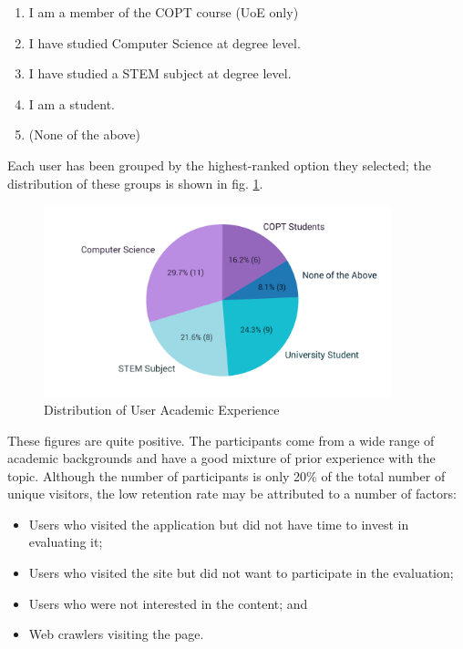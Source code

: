 \documentclass[bsc,twoside,singlespacing,parskip,logo,notimes,normalheadings]{infthesis}
\begin{document}
    \begin{enumerate}
      \item I am a member of the COPT course (UoE only)
      \item I have studied Computer Science at degree level.
      \item I have studied a STEM subject at degree level.
      \item I am a student.
      \item (None of the above)
    \end{enumerate}

    Each user has been grouped by the highest-ranked option they
    selected; the distribution of these groups is shown in
    fig. \ref{fig:demo-q2}.

    \begin{figure}[!hb]
      \centering
      \captionsetup{width=\textwidth, justification=centering}
      \caption{Distribution of User Academic Experience}\label{fig:demo-q2}
      \includegraphics[width=0.9\textwidth, trim=40 200 0 0]{img/background_pie.pdf}
    \end{figure}

    These figures are quite positive. The participants come from a
    wide range of academic backgrounds and have a good mixture of
    prior experience with the topic. Although the number of
    participants is only 20\% of the total number of unique visitors,
    the low retention rate may be attributed to a number of factors:

    \begin{itemize}
    \item Users who visited the application but did not have time to
      invest in evaluating it;
    \item Users who visited the site but did not want to participate
      in the evaluation;
    \item Users who were not interested in the content; and
    \item Web crawlers visiting the page.
    \end{itemize}
\end{document}
